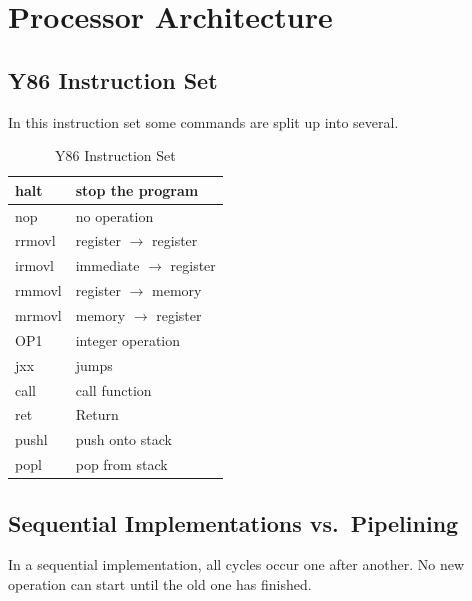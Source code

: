 \section{Processor Architecture}

    \subsection{Y86 Instruction Set}
    In this instruction set some commands are split up into several.
        \begin{table}[ht]
            \centering
            \begin{tabular}{| l | l |}
                \hline
                halt   & stop the program\\
                \hline
                nop    & no operation\\
                \hline
                rrmovl & register $\to$ register\\
                \hline
                irmovl & immediate $\to$ register\\
                \hline
                rmmovl & register $\to$ memory\\
                \hline
                mrmovl & memory $\to$ register\\
                \hline
                OP1    & integer operation\\
                \hline
                jxx    & jumps\\
                \hline
                call   & call function\\
                \hline
                ret    & Return\\
                \hline
                pushl  & push onto stack\\
                \hline
                popl   & pop from stack\\
                \hline
            \end{tabular}
            \label{table:y86}
            \caption{Y86 Instruction Set}
        \end{table}

    \subsection{Sequential Implementations vs.\ Pipelining}
    In a sequential implementation, all cycles occur one after another. No new operation can start until the old one has finished.

